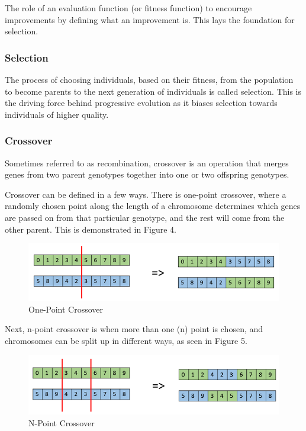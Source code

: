 \documentclass[12pt,a4paper]{article}
\begin{document}
The role of an evaluation function (or fitness function) to encourage improvements by defining what an improvement is\citep{IntroductionToEvolutionaryComputing}. This lays the foundation for selection. 

\subsubsection{Selection}
The process of choosing individuals, based on their fitness, from the population to become parents to the next generation of individuals is called selection\citep{IntroductionToEvolutionaryComputing}. This is the driving force behind progressive evolution as it biases selection towards individuals of higher quality. 

\subsubsection{Crossover}
Sometimes referred to as recombination, crossover is an operation that merges genes from two parent genotypes together into one or two offspring genotypes\citep{IntroductionToEvolutionaryComputing}. 

Crossover can be defined in a few ways. There is one-point crossover, where a randomly chosen point along the length of a chromosome determines which genes are passed on from that particular genotype, and the rest will come from the other parent. This is demonstrated in Figure 4.

\begin{figure}[h]
	\centering
	\includegraphics[width = \textwidth]{one_point_crossover.jpg}
	\caption{One-Point Crossover}
\end{figure}

Next, n-point crossover is when more than one (n) point is chosen, and chromosomes can be split up in different ways, as seen in Figure 5. 

\begin{figure}[h]
	\centering
	\includegraphics[width = \textwidth]{multi_point_crossover.jpg}
	\caption{N-Point Crossover}
\end{figure}
\end{document}
